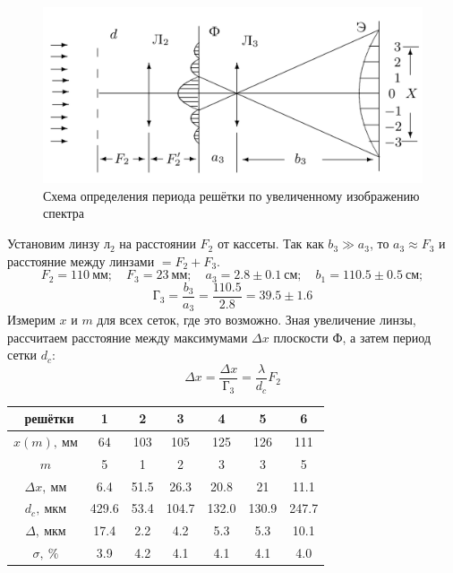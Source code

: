 \documentclass[a4paper, 12pt]{article}%
\begin{document}
\begin{figure}[H]
	\includegraphics[width = 1.0\linewidth]{pics/3.png}
	\caption*{Схема определения периода решётки по увеличенному изображению спектра}
\end{figure}
Установим линзу $л_2$ на расстоянии $F_2$ от кассеты. Так как $b_3 \gg a_3$, то $a_3 \approx F_3$ и расстояние между линзами $= F_2 + F_3$. 
\[
F_2 = 110\ мм; \quad F_3 = 23\ мм; \quad a_3 = 2.8 \pm 0.1\ см; \quad b_1 = 110.5 \pm 0.5\ см;
\]
\[
	\text{Г}_{\text{3}} = \frac{b_3}{a_3} = \frac{110.5}{2.8} = 39.5 \pm 1.6
\]
Измерим $x$ и $m$ для всех сеток, где это возможно. Зная увеличение линзы, рассчитаем расстояние между максимумами $\Delta x$ плоскости Ф, а затем период сетки $d_c$:
\[
	\Delta x = \frac{\Delta x}{\text{Г}_3} = \frac{\lambda}{d_c} F_2
\]
\begin{table}[H]
	\centering
	\begin{tabular}{|c|c|c|c|c|c|c|}  \hline
	\textnumero\ решётки & 1 & 2 & 3 & 4 & 5 & 6 \\\hline
	$x(m),\ мм$ & 64 & 103 & 105 & 125 & 126 & 111 \\\hline
	$m$ & 5 & 1 & 2 & 3 & 3 & 5 \\\hline
	$\Delta x,\ мм$ & 6.4 & 51.5 & 26.3 & 20.8 & 21 & 11.1 \\\hline
	$d_c,\ мкм$ & 429.6 & 53.4 & 104.7 & 132.0 & 130.9 & 247.7 \\\hline
	$\Delta,\ мкм$ & 17.4 & 2.2 & 4.2 & 5.3 & 5.3 & 10.1 \\\hline
	$\sigma,\ \%$ & 3.9 & 4.2 & 4.1 & 4.1 & 4.1 & 4.0 \\\hline
	\end{tabular}
	\end{table}
	
\end{document}
